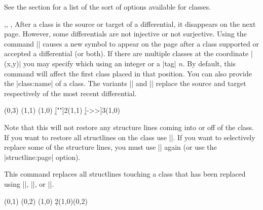 \begin{sseqdata}[name = basic, cohomological Serre grading]
\begin{command}{\class\ooptions{}}
See the  section for a list of the sort of options available for classes.
\end{command}

\begin{commandlist}{{\replaceclass\ooptions{}},\replaceclass\ooptions{}, \replacesource\ooptions, \replacetarget\ooptions}
After a class is the source or target of a differential, it disappears on the next page. However, some differentials are not injective or not surjective. Using the command |\replaceclass| causes a new symbol to appear on the page after a class supported or accepted a differential (or both). If there are multiple classes at the coordinate |(x,y)| you may specify which using an integer or a |tag| $n$. By default, this command will affect the first class placed in that position. You can also provide the |class:name| of a class. The variants |\replacesource| and |\replacetarget| replace the source and target respectively of the most recent differential.
\begin{codeexample}[]
\begin{sseqdata}[name = replace class example, Adams grading, classes = {draw = none } ]
\class["\mathbb{Z}"](0,3)
\class["\mathbb{Z}"](1,1)
\class["\mathbb{Z}"](1,0)
\d[""]2(1,1)
\replacetarget["\mathbb{Z}/2"] %
\d[->>]3(1,0)
\replacesource["2\mathbb{Z}"]    %
\end{sseqdata}
\printpage[ name = replace class example, page = 2 ] \qquad
\printpage[ name = replace class example, page = 3 ] \qquad
\printpage[ name = replace class example, page = 4 ]
\end{codeexample}
Note that this will not restore any structure lines coming into or off of the class. If you want to restore all structlines on the class use |\replacestructlines|. If you want to selectively replace some of the structure lines, you must use |\structline| again (or use the |structline:page| option).
\end{commandlist}

\begin{command}{\replacestructlines\opt{\pars{\sourcecoord}}}
This command replaces all structlines touching a class that has been replaced using |\replaceclass|, |\replacesource|, or |\replacetarget|.
\begin{codeexample}[]
\begin{sseqdata}[name=replacestructlines]
\class(0,1)
\class(0,2)
\structline
\class(1,0)
\d2(1,0)(0,2)
\replacetarget\replacestructlines
\end{sseqdata}
\printpage[name=replacestructlines, page=3]
\end{codeexample}
\end{command}


\end{sseqdata}
